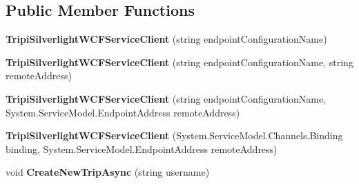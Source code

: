 \subsection*{Public Member Functions}
\begin{DoxyCompactItemize}
\item 
\hypertarget{class_silverlight_showcase_1_1_tripi_silverlight_w_c_f_service_reference_1_1_tripi_silverlight_w_c_f_service_client_a728efc379a3f12579cf78a3048346db0}{
{\bfseries TripiSilverlightWCFServiceClient} (string endpointConfigurationName)}
\label{class_silverlight_showcase_1_1_tripi_silverlight_w_c_f_service_reference_1_1_tripi_silverlight_w_c_f_service_client_a728efc379a3f12579cf78a3048346db0}

\item 
\hypertarget{class_silverlight_showcase_1_1_tripi_silverlight_w_c_f_service_reference_1_1_tripi_silverlight_w_c_f_service_client_a91b740aea904fbd5681ce360055b2230}{
{\bfseries TripiSilverlightWCFServiceClient} (string endpointConfigurationName, string remoteAddress)}
\label{class_silverlight_showcase_1_1_tripi_silverlight_w_c_f_service_reference_1_1_tripi_silverlight_w_c_f_service_client_a91b740aea904fbd5681ce360055b2230}

\item 
\hypertarget{class_silverlight_showcase_1_1_tripi_silverlight_w_c_f_service_reference_1_1_tripi_silverlight_w_c_f_service_client_a40ed5d3f39b42bbf9c9740d6e492beae}{
{\bfseries TripiSilverlightWCFServiceClient} (string endpointConfigurationName, System.ServiceModel.EndpointAddress remoteAddress)}
\label{class_silverlight_showcase_1_1_tripi_silverlight_w_c_f_service_reference_1_1_tripi_silverlight_w_c_f_service_client_a40ed5d3f39b42bbf9c9740d6e492beae}

\item 
\hypertarget{class_silverlight_showcase_1_1_tripi_silverlight_w_c_f_service_reference_1_1_tripi_silverlight_w_c_f_service_client_a744122b9f14857f9535aed8a5f932e60}{
{\bfseries TripiSilverlightWCFServiceClient} (System.ServiceModel.Channels.Binding binding, System.ServiceModel.EndpointAddress remoteAddress)}
\label{class_silverlight_showcase_1_1_tripi_silverlight_w_c_f_service_reference_1_1_tripi_silverlight_w_c_f_service_client_a744122b9f14857f9535aed8a5f932e60}

\item 
\hypertarget{class_silverlight_showcase_1_1_tripi_silverlight_w_c_f_service_reference_1_1_tripi_silverlight_w_c_f_service_client_aa3bebc8250ae7ca4ffb16f7163f4f625}{
void {\bfseries CreateNewTripAsync} (string username)}
\label{class_silverlight_showcase_1_1_tripi_silverlight_w_c_f_service_reference_1_1_tripi_silverlight_w_c_f_service_client_aa3bebc8250ae7ca4ffb16f7163f4f625}


\end{DoxyCompactItemize}

